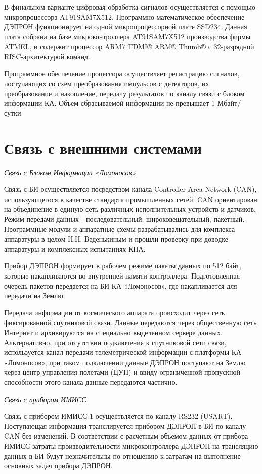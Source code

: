 В финальном варианте цифровая обработка сигналов осуществляется с помощью микропроцессора AT91SAM7X512. Программно-математическое обеспечение ДЭПРОН функционирует на одной микропроцессорной плате SSD234. Данная плата собрана на базе микроконтроллера AT91SAM7X512 производства фирмы ATMEL, и содержит процессор ARM7 TDMI® ARM® Thumb® с 32-разрядной RISC-архитектурой команд.

Программное обеспечение процессора осуществляет регистрацию сигналов, поступающих со схем преобразования импульсов с детекторов, их преобразование и накопление, передачу результатов по каналу связи с блоком информации КА. Объем сбрасываемой информации не превышает 1 Мбайт/сутки.

\section{Связь с внешними системами}
\emph{Связь с Блоком Информации «Ломоносов»}

Связь с БИ осуществляется посредством канала Controller Area Network (CAN), использующегося в качестве стандарта промышленных сетей. CAN ориентирован на объединение в единую сеть различных исполнительных устройств и датчиков. Режим передачи данных - последовательный, широковещательный, пакетный. Программные модули и аппаратные схемы разрабатывались для комплекса аппаратуры в целом Н.Н. Веденькиным и прошли проверку при доводке аппаратуры и комплексных испытаниях КНА.

Прибор ДЭПРОН формирует в рабочем режиме пакеты данных по 512 байт, которые накапливаются во внутренней памяти контроллера. Подготовленная очередь пакетов передается на БИ КА «Ломоносов», где накапливается для передачи на Землю.

Передача информации от космического аппарата происходит через сеть фиксированной спутниковой связи. Данные передаются через общественную сеть Интернет и архивируются на специально выделенном сервере данных. Альтернативно, при отсутствии подключения к спутниковой сети связи, используется канал передачи телеметрической информации с платформы КА «Ломоносов», при таком подключении данные ДЭПРОН поступают на Землю через центр управления полетами (ЦУП) и ввиду ограниченной пропускной способности этого канала данные передаются частично.

\emph{Связь с прибором ИМИСС}

Связь с прибором ИМИСС-1 осуществляется по каналу RS232 (USART). Поступающая информация транслируется прибором ДЭПРОН в БИ по каналу CAN без изменений. В соответствии с расчетным объемом данных от прибора ИМИСС затраты производительности микроконтроллера ДЭПРОН на трансляцию данных в БИ будут незначительны по отношению к затратам на выполнение основных задач прибора ДЭПРОН.

